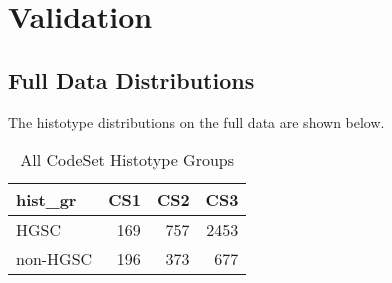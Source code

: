 \documentclass[
]{report}
\begin{document}
\hypertarget{validation}{%
\chapter{Validation}\label{validation}}

\hypertarget{full-data-distributions}{%
\section{Full Data Distributions}\label{full-data-distributions}}

The histotype distributions on the full data are shown below.

\begin{table}

\caption{\label{tab:dist-all-gr}All CodeSet Histotype Groups}
\centering
\begin{tabular}[t]{l|r|r|r}
\hline
hist\_gr & CS1 & CS2 & CS3\\
\hline
HGSC & 169 & 757 & 2453\\
\hline
non-HGSC & 196 & 373 & 677\\
\hline
\end{tabular}
\end{table}
\end{document}
